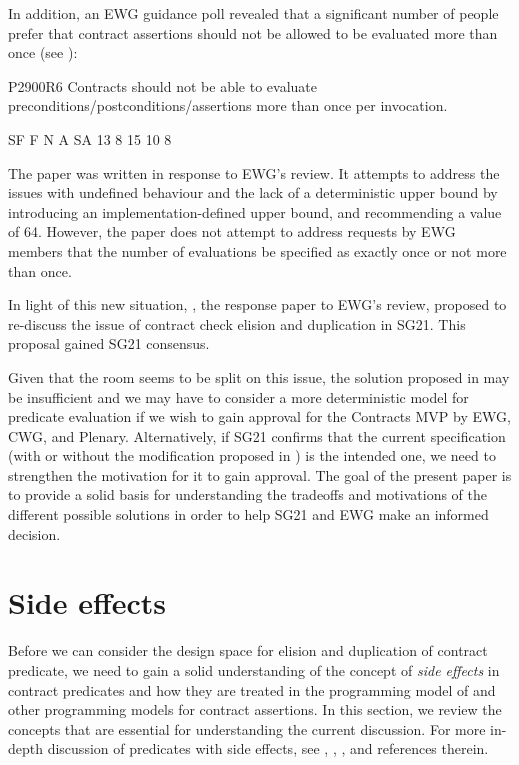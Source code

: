 In addition, an EWG guidance poll revealed that a significant number of people prefer that contract assertions should not be allowed to be evaluated more than once (see \cite{D3197R0}):

\begin{tcolorbox}[colback=green!5!white,colframe=green!75!black,title=EWG Poll 2024-03-20 (Tokyo)]
P2900R6 Contracts should not be able to evaluate preconditions/postconditions/assertions more than once per invocation.
\vspace{3mm}
\begin{codeblock}
SF F  N  A  SA
13 8  15 10 8
\end{codeblock}
\end{tcolorbox}

The paper \cite{P3119R0} was written in response to EWG's review. It attempts to address the issues with undefined behaviour and the lack of a deterministic upper bound by introducing an implementation-defined upper bound, and recommending a value of 64. However, the paper does not attempt to address requests by EWG members that the number of evaluations be specified as exactly once or not more than once.

In light of this new situation, \cite{D3197R0}, the response paper to EWG's review, proposed to re-discuss the issue of contract check elision and duplication in SG21. This proposal gained SG21 consensus.

Given that the room seems to be split on this issue, the solution proposed in \cite{P3119R0} may be insufficient and we may have to consider a more deterministic model for predicate evaluation if we wish to gain approval for the Contracts MVP by EWG, CWG, and Plenary. Alternatively, if SG21 confirms that the current specification (with or without the modification proposed in \cite{P3119R0}) is the intended one, we need to strengthen the motivation for it to gain approval. The goal of the present paper is to provide a solid basis for understanding the tradeoffs and motivations of the different possible solutions in order to help SG21 and EWG make an informed decision.



\section{Side effects}
\label{sec:sideeffects}

Before we can consider the design space for elision and duplication of contract predicate, we need to gain a solid understanding of the concept of \emph{side effects} in contract predicates and how they are treated in the programming model of \cite{P2900R6} and other programming models for contract assertions. In this section, we review the concepts that are essential for understanding the current discussion. For more in-depth discussion of predicates with side effects, see \cite{P2570R2}, \cite{P2712R0}, \cite{P2751R1}, and references therein.

